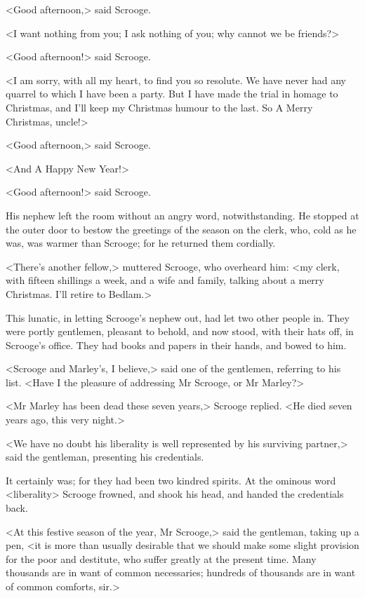 <Good afternoon,> said Scrooge.

<I want nothing from you; I ask nothing of you; why cannot we be friends?>

<Good afternoon!> said Scrooge.

<I am sorry, with all my heart, to find you so resolute. We have never had any
quarrel to which I have been a party. But I have made the trial in homage to
Christmas, and I'll keep my Christmas humour to the last. So A Merry Christmas,
uncle!>

<Good afternoon,> said Scrooge.

<And A Happy New Year!>

<Good afternoon!> said Scrooge.

His nephew left the room without an angry word, notwithstanding. He stopped at
the outer door to bestow the greetings of the season on the clerk, who, cold as
he was, was warmer than Scrooge; for he returned them cordially.

<There's another fellow,> muttered Scrooge, who overheard him: <my clerk, with
fifteen shillings a week, and a wife and family, talking about a merry
Christmas. I'll retire to Bedlam.>

This lunatic, in letting Scrooge's nephew out, had let two other people in. They
were portly gentlemen, pleasant to behold, and now stood, with their hats off,
in Scrooge's office. They had books and papers in their hands, and bowed to him.

<Scrooge and Marley's, I believe,> said one of the gentlemen, referring to his
list. <Have I the pleasure of addressing Mr Scrooge, or Mr Marley?>

<Mr Marley has been dead these seven years,> Scrooge replied. <He died seven
years ago, this very night.>

<We have no doubt his liberality is well represented by his surviving partner,>
said the gentleman, presenting his credentials.

It certainly was; for they had been two kindred spirits. At the ominous word
<liberality> Scrooge frowned, and shook his head, and handed the credentials
back.

<At this festive season of the year, Mr Scrooge,> said the gentleman, taking up
a pen, <it is more than usually desirable that we should make some slight
provision for the poor and destitute, who suffer greatly at the present time.
Many thousands are in want of common necessaries; hundreds of thousands are in
want of common comforts, sir.>


